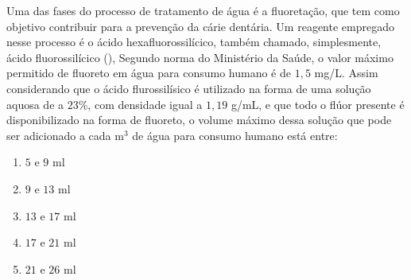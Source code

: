 Uma das fases do processo de tratamento de água é a fluoretação, que tem como objetivo contribuir para a prevenção da cárie dentária.
Um reagente empregado nesse processo é o ácido hexafluorossilícico, também chamado, simplesmente, ácido fluorossilícico (), Segundo norma do Ministério da Saúde, o valor máximo permitido de fluoreto em água para consumo humano é de $1,5$ mg/L.
Assim considerando que o ácido flurossilísico é utilizado na forma de uma solução aquosa de  a $23\%$, com densidade igual a $1,19$ g/mL, e que todo o flúor presente é disponibilizado na forma de fluoreto, o volume máximo dessa solução que pode ser adicionado a cada m$^3$ de água para consumo humano está entre: 

\begin{enumerate}[label = (\alph*)]
	\item $5$ e $9$ ml
	\item $9$ e $13$ ml
	\item $13$ e $17$ ml
	\item $17$ e $21$ ml
	\item $21$ e $26$ ml
\end{enumerate}
